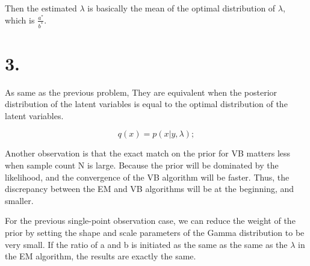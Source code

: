 \documentclass{article}
\begin{document}
Then the estimated $\lambda$ is basically the mean of the optimal distribution of $\lambda$, which is $\frac{a^*}{b^*}$.

\section*{3.}

As same as the previous problem, They are equivalent when the posterior distribution of the latent variables is equal to the optimal distribution of the latent variables.

\[ 
    q(x) = p(x|y,\lambda);
\]

Another observation is that the exact match on the prior for VB matters less when sample count N is large. Because the prior will be dominated by the likelihood, and the 
convergence of the VB algorithm will be faster. Thus, the discrepancy between the EM and VB algorithms will be at the beginning, and smaller. 

For the previous single-point observation case, we can reduce the weight of the prior by setting the shape and scale parameters of the Gamma distribution to be very small. If
the ratio of a and b is initiated as the same as the same as the $\lambda$ in the EM algorithm, the results are exactly the same.
\end{document}
